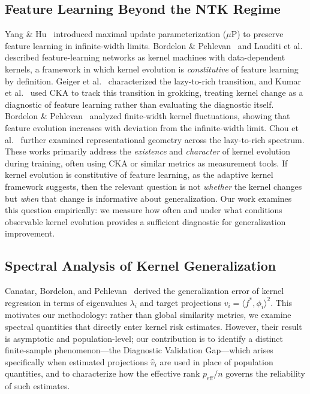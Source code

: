 \documentclass[twoside,11pt]{article}
\begin{document}
\subsection{Feature Learning Beyond the NTK Regime}
Yang \& Hu~\cite{yang2021tensor} introduced maximal update parameterization ($\mu$P) to preserve feature learning in infinite-width limits.  Bordelon \& Pehlevan~\cite{bordelon2022spectral} and Lauditi et al.~\cite{lauditi2025adaptive} described feature-learning networks as kernel machines with data-dependent kernels, a framework in which kernel evolution is \emph{constitutive} of feature learning by definition.  Geiger et al.~\cite{geiger2020scaling} characterized the lazy-to-rich transition, and Kumar et al.~\cite{kumar2024grokking} used CKA to track this transition in grokking, treating kernel change as a diagnostic of feature learning rather than evaluating the diagnostic itself.  Bordelon \& Pehlevan~\cite{bordelon2023dynamics} analyzed finite-width kernel fluctuations, showing that feature evolution increases with deviation from the infinite-width limit.  Chou et al.~\cite{chou2025feature} further examined representational geometry across the lazy-to-rich spectrum.  These works primarily address the \emph{existence} and \emph{character} of kernel evolution during training, often using CKA or similar metrics as measurement tools.  If kernel evolution is constitutive of feature learning, as the adaptive kernel framework suggests, then the relevant question is not \emph{whether} the kernel changes but \emph{when} that change is informative about generalization.  Our work examines this question empirically: we measure how often and under what conditions observable kernel evolution provides a sufficient diagnostic for generalization improvement.

\subsection{Spectral Analysis of Kernel Generalization}
Canatar, Bordelon, and Pehlevan~\cite{canatar2021spectral} derived the generalization error of kernel regression in terms of eigenvalues $\lambda_{i}$ and target projections $v_{i}=\langle f^{*},\phi_{i}\rangle^{2}$.  This motivates our methodology: rather than global similarity metrics, we examine spectral quantities that directly enter kernel risk estimates.  However, their result is asymptotic and population-level; our contribution is to identify a distinct finite-sample phenomenon---the Diagnostic Validation Gap---which arises specifically when estimated projections $\hat{v}_i$ are used in place of population quantities, and to characterize how the effective rank $p_{\text{eff}}/n$ governs the reliability of such estimates.
\end{document}
